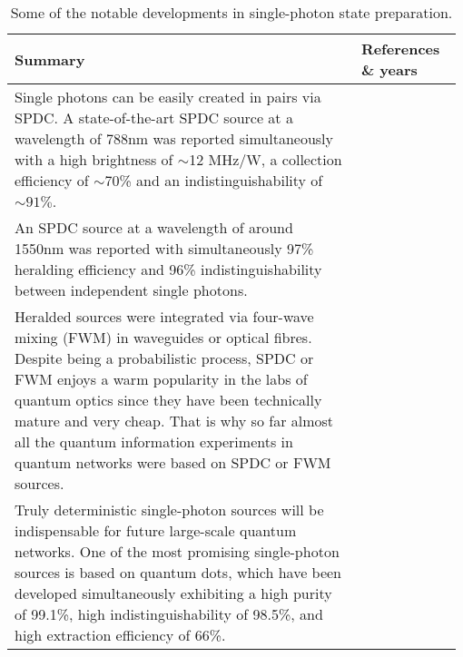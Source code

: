 \begin{table*}[!htbp]
	\begin{tabular}{|p{0.755\linewidth}|p{0.22\linewidth}|}
		\hline
	\textbf{Summary} & \textbf{References \& years} \\	\hline \hline
		Single photons can be easily created in pairs via SPDC. A state-of-the-art SPDC source at a wavelength of 788nm was reported simultaneously with a high brightness of $\sim$12 MHz/W, a collection efficiency of $\sim$70\% and an indistinguishability of $\sim 91\%$. & \cite{bib:wang2016experimental} \\
		\hline
		An SPDC source at a wavelength of around 1550nm was reported with simultaneously 97\% heralding efficiency and 96\% indistinguishability between independent single photons. & \cite{bib:zhong201812} \\
		\hline
		Heralded sources were integrated via four-wave mixing (FWM) in waveguides or optical fibres. Despite being a probabilistic process, SPDC or FWM enjoys a warm popularity in the labs of quantum optics since they have been technically mature and very cheap. That is why so far almost all the quantum information experiments in quantum networks were based on SPDC or FWM sources. & \cite{bib:silverstone2014, bib:spring2017chip, bib:goldschmidt2008, bib:smith2009} \\
		\hline
		Truly deterministic single-photon sources will be indispensable for future large-scale quantum networks. One of the most promising single-photon sources is based on quantum dots, which have been developed simultaneously exhibiting a high purity of 99.1\%, high indistinguishability of 98.5\%, and high extraction efficiency of 66\%. & \cite{bib:he2013on, bib:wei2014de, bib:ding2016on, bib:somaschi2016, bib:wang2016near, bib:loredo2016} \\
		\hline
	\end{tabular}
	\captionspacetab \caption{Some of the notable developments in single-photon state preparation.} \label{tab:single_photon_state}
\end{table*}

